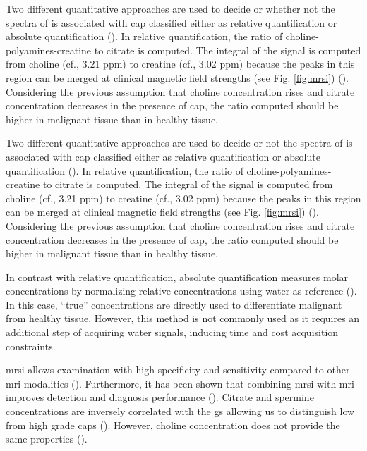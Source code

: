 \begin{enumerate}[leftmargin=*]
Two different quantitative approaches are used to decide or whether not the spectra of  is associated with \ac{cap} classified either as relative quantification or absolute quantification (\cite{Lemaitre2011}). In relative quantification, the ratio of choline-polyamines-creatine to citrate is computed. The integral of the signal is computed from choline (cf., 3.21 ppm) to creatine (cf., 3.02 ppm) because the peaks in this region can be merged at clinical magnetic field strengths (see Fig. \ref{fig:mrsi}) (\cite{Hoeks2011,Graaf2000}). Considering the previous assumption that choline concentration rises and citrate concentration decreases in the presence of \ac{cap}, the ratio computed should be higher in malignant tissue than in healthy tissue. 

Two different quantitative approaches are used to decide or not the spectra of  is associated with \ac{cap} classified either as relative quantification or absolute quantification (\cite{Lemaitre2011}). In relative quantification, the ratio of choline-polyamines-creatine to citrate is computed. The integral of the signal is computed from choline (cf., 3.21 ppm) to creatine (cf., 3.02 ppm) because the peaks in this region can be merged at clinical magnetic field strengths (see Fig. \ref{fig:mrsi}) (\cite{Hoeks2011,Graaf2000}). Considering the previous assumption that choline concentration rises and citrate concentration decreases in the presence of \ac{cap}, the ratio computed should be higher in malignant tissue than in healthy tissue. 

In contrast with relative quantification, absolute quantification measures molar concentrations by normalizing relative concentrations using water as reference (\cite{Lemaitre2011}). In this case, ``true'' concentrations are directly used to differentiate malignant from healthy tissue. However, this method is not commonly used as it requires an additional step of acquiring water signals, inducing time and cost acquisition constraints.

\ac{mrsi} allows examination with high specificity and sensitivity compared to other \ac{mri} modalities (\cite{Choi2007}). Furthermore, it has been shown that combining \ac{mrsi} with \ac{mri} improves detection and diagnosis performance (\cite{Scheidler1999a,Kaji1998,Vilanova2009}). Citrate and spermine concentrations are inversely correlated with the \ac{gs} allowing us to distinguish low from high grade \acp{cap} (\cite{Giskeodegard2013}). However, choline concentration does not provide the same properties (\cite{Giskeodegard2013}).


\end{enumerate}
